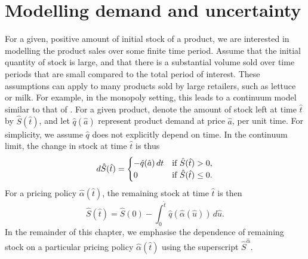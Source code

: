 \documentclass[main.tex]{subfiles}
\begin{document}
\section{Modelling demand and uncertainty}\label{sec:cts_modelling}
For a given, positive amount of initial stock of a product, we are interested in
modelling the product sales over some finite time period.
Assume that the initial quantity of stock is large, and that there is a
substantial volume sold over time periods that are small compared to the total
period of interest. These assumptions can apply to many products sold
by large retailers, such as lettuce or milk. For example, in the monopoly setting, this leads to
a continuum model similar to that of \citet{kalish1983monopolist}.
For a given product, denote the amount of stock left at time $\hat{t}$ by $\hat{S}(\hat{t})$,
and let $\hat{q}(\hat{a})$ represent product demand at price $\hat{a}$, per unit
time.
For simplicity, we assume $\hat{q}$ does not explicitly depend on time.
In the continuum limit, the change in  stock at time $\hat{t}$
is thus
\begin{equation}
  d\hat{S}(\hat{t})=
  \begin{cases}
    -\hat{q}(\hat{a})\,dt & \textnormal{if } \hat{S}(\hat{t})>0,\\
    0& \textnormal{if }  \hat{S}(\hat{t})\leq 0.
  \end{cases}
\end{equation}
For a pricing policy
$\hat{\alpha}(\hat{t})$, the remaining stock at time $\hat{t}$ is then
\begin{equation}
  \hat{S}(\hat{t})=\hat{S}(0)-\int_0^{\hat{t}}\hat{q}(\hat{\alpha}(\hat{u}))\,d\hat{u}.
\end{equation}
In the remainder of this chapter,
we emphasise the dependence of remaining stock on a particular
pricing policy $\hat{\alpha}(\hat{t})$ using the superscript $\hat{S}^{\hat{\alpha}}$.
\end{document}
